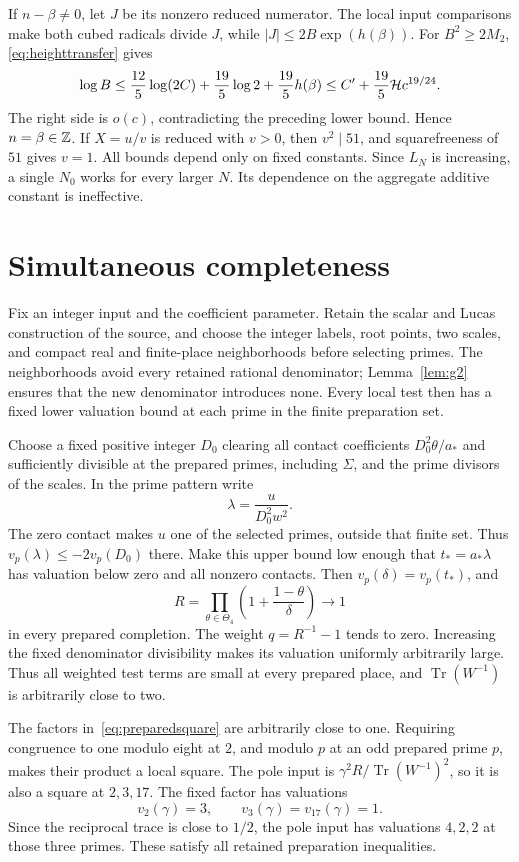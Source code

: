 \documentclass[11pt,a4paper]{article}
\DeclareMathOperator{\Tr}{Tr}\DeclareMathOperator{\Nm}{Nm}
\begin{document}
If $n-\beta\ne0$, let $J$ be its nonzero reduced numerator.
The local input comparisons make both cubed radicals divide $J$,
while $|J|\le2B\exp(h(\beta))$. For $B^2\ge2M_2$,
\eqref{eq:heighttransfer} gives
\[
 \log B\le\frac{12}{5}\log(2C)+\frac{19}{5}\log2
                +\frac{19}{5}h(\beta)
 \le C'+\frac{19}{5}\mathcal H c^{19/24}.
\]
The right side is $o(c)$, contradicting the preceding lower bound.
Hence $n=\beta\in\mathbb Z$. If $X=u/v$ is reduced with $v>0$, then
$v^2\mid51$, and squarefreeness of $51$ gives $v=1$.
All bounds depend only on fixed constants. Since $L_N$ is increasing,
a single $N_0$ works for every larger $N$. Its dependence on the
aggregate additive constant is ineffective.

\section{Simultaneous completeness}
Fix an integer input and the coefficient parameter. Retain the scalar
and Lucas construction of the source, and choose the integer labels,
root points, two scales, and compact real and finite-place neighborhoods
before selecting primes. The neighborhoods avoid every retained
rational denominator; Lemma~\ref{lem:g2} ensures that the new
denominator introduces none. Every local test then has a fixed lower
valuation bound at each prime in the finite preparation set.

Choose a fixed positive integer $D_0$ clearing all contact coefficients
$D_0^2\theta/a_*$ and sufficiently divisible at the prepared primes,
including $\Sigma$, and the prime divisors of the scales. In the prime
pattern write
\[
                         \lambda=\frac{u}{D_0^2w^2}.
\]
The zero contact makes $u$ one of the selected primes, outside that
finite set. Thus $v_p(\lambda)\le-2v_p(D_0)$ there. Make this upper
bound low enough that $t_*=a_*\lambda$ has valuation below zero and
all nonzero contacts. Then $v_p(\delta)=v_p(t_*)$, and
\begin{equation}\label{eq:preparedsquare}
 R=\prod_{\theta\in\Theta_4}
                 \left(1+\frac{1-\theta}{\delta}\right)
       \longrightarrow1
\end{equation}
in every prepared completion. The weight $q=R^{-1}-1$ tends to zero.
Increasing the fixed denominator divisibility makes its valuation
uniformly arbitrarily large. Thus all weighted test terms are small
at every prepared place, and $\Tr(W^{-1})$ is arbitrarily close to two.

The factors in~\eqref{eq:preparedsquare} are arbitrarily close to one.
Requiring congruence to one modulo eight at $2$, and modulo $p$ at an odd
prepared prime $p$, makes their product a local square. The pole input
is $\gamma^2R/\Tr(W^{-1})^2$, so it is also a square at $2,3,17$.
The fixed factor has valuations
\[
 v_2(\gamma)=3,\qquad v_3(\gamma)=v_{17}(\gamma)=1.
\]
Since the reciprocal trace is close to $1/2$, the pole input has
valuations $4,2,2$ at those three primes. These satisfy all retained
preparation inequalities.
\end{document}
